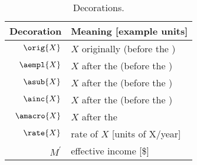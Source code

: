 
\begin{table}
\centering %
\caption{Decorations.}
\begin{tabular}{r l}
  \toprule
  Decoration & Meaning [example units] \\
  \midrule
  $\orig{X}$ & $X$ originally (before the \empleffect{}) \\
  $\aempl{X}$  & $X$ after the \empleffect{} (before the \subeffect{}) \\
  $\asub{X}$ & $X$ after the \subeffect{} (before the \inceffect{}) \\
  $\ainc{X}$ & $X$ after the \inceffect{} (before the \macroeffect{}) \\
  $\amacro{X}$ & $X$ after the \macroeffect{} \\
  $\rate{X}$ & rate of $X$ [units of X/year] \\
  $M^\prime$ & effective income [\$] \\
  \bottomrule
\end{tabular}
\label{tab:decorations}
\end{table}



